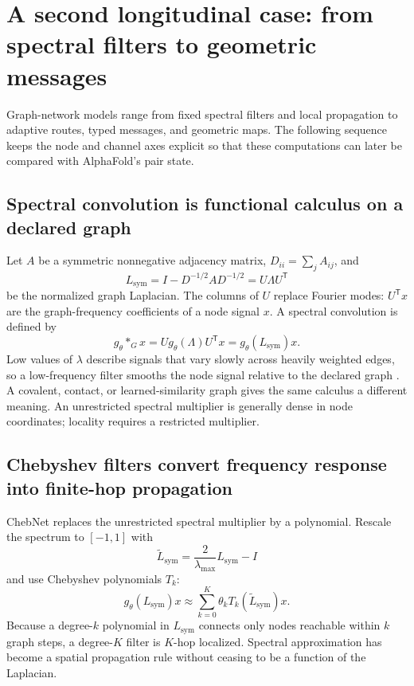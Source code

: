 \section[From spectral filters to geometric messages]
{A second longitudinal case: from spectral filters to geometric messages}
\label{sec:book-gcn-lineage}

Graph-network models range from fixed spectral filters and local propagation to adaptive routes,
typed messages, and geometric maps.  The following sequence keeps the node and channel axes
explicit so that these computations can later be compared with AlphaFold's pair state.

\subsection{Spectral convolution is functional calculus on a declared graph}

Let $A$ be a symmetric nonnegative adjacency matrix, $D_{ii}=\sum_jA_{ij}$, and
\begin{equation}
L_{\mathrm{sym}}=I-D^{-1/2}AD^{-1/2}=U\Lambda U^{\mathsf T}
\label{eq:book-gcn-laplacian}
\end{equation}
be the normalized graph Laplacian.  The columns of $U$ replace Fourier modes: $U^{\mathsf T}x$
are the graph-frequency coefficients of a node signal $x$.  A spectral convolution is defined by
\begin{equation}
g_\theta *_G x
=Ug_\theta(\Lambda)U^{\mathsf T}x
=g_\theta(L_{\mathrm{sym}})x.
\label{eq:book-gcn-spectral-convolution}
\end{equation}
Low values of $\lambda$ describe signals that vary slowly across heavily weighted edges, so a
low-frequency filter smooths the node signal relative to the declared graph
\cite{bruna2014,defferrard2016}.  A covalent, contact, or learned-similarity graph gives the same
calculus a different meaning.  An unrestricted spectral multiplier is generally dense in node
coordinates; locality requires a restricted multiplier.

\subsection{Chebyshev filters convert frequency response into finite-hop propagation}

ChebNet replaces the unrestricted spectral multiplier by a polynomial.  Rescale the spectrum to
$[-1,1]$ with
\begin{equation}
\widetilde L_{\mathrm{sym}}=\frac{2}{\lambda_{\max}}L_{\mathrm{sym}}-I
\end{equation}
and use Chebyshev polynomials $T_k$:
\begin{equation}
g_\theta(L_{\mathrm{sym}})x
\approx
\sum_{k=0}^{K}\theta_kT_k(\widetilde L_{\mathrm{sym}})x.
\label{eq:book-gcn-chebyshev}
\end{equation}
Because a degree-$k$ polynomial in $L_{\mathrm{sym}}$ connects only nodes reachable within $k$ graph steps, a
degree-$K$ filter is $K$-hop localized.  Spectral approximation has become a spatial propagation
rule without ceasing to be a function of the Laplacian.

